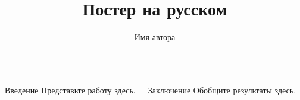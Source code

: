 \documentclass{beamer}
\title{Постер на русском}
\author{Имя автора}
\begin{document}
\begin{frame}
\begin{columns}[t]
  \begin{block}{Введение}
    Представьте работу здесь.
  \end{block}
  \begin{block}{Заключение}
    Обобщите результаты здесь.
  \end{block}
\end{columns}
\end{frame}
\end{document}
